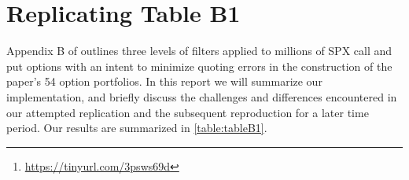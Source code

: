 \begin{titlepage}

% 
\maketitle


\doublespacing
\begin{abstract}
In this report we summarize our efforts to replicate the data filtration process described in Appendix B of \textit{The Puzzle of Index Option Returns} by \citet{constantinides2013}. These filters shape the underlying distribution of implied volatility (``IV'') and moneyness for a large cross-section of SPX index options (1 million+), and were used to build and price 54 option portfolios. Due to the unavailability of SPX option data from 1985 to 1995, we focus our analysis on replicating the filtration results OptionMetrics data from \STARTONE\  to \ENDONE. We then apply these filters to more recent data from \STARTTWO\  to \ENDTWO. Through a sequence of data visualizations, we show that while the paper's intricately constructed data filters may yield elegant results when applied to one time period, these results do not necessarily port over to other time periods. The implications for option pricing models based on such time-fragile data filters would be an interesting follow-up study. Our detailed analysis and code can be readily found on \href{https://tinyurl.com/3psws69d}{Github}\footnote{ \url{https://tinyurl.com/3psws69d}}.  


\end{abstract}


\end{titlepage}

\doublespacing


\section{Replicating Table B1}

Appendix B of \citet{constantinides2013} outlines three levels of filters applied to millions of SPX call and put options with an intent to minimize quoting errors in the construction of the paper's 54 option portfolios. In this report we will summarize our implementation, and briefly discuss the challenges and differences encountered in our attempted replication and the subsequent reproduction for a later time period. Our results are summarized in \autoref{table:tableB1}. 

